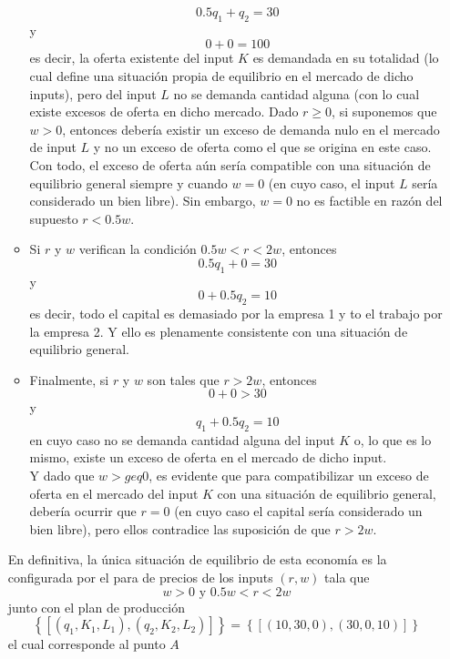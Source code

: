 \begin{enumerate}[a)]
\begin{itemize}
					$$0.5q_1 + q_2 = 30$$
			y
					$$0 + 0 = 100$$
			es decir, la oferta existente del input $K$ es demandada en su totalidad (lo cual define una situación propia de equilibrio en el mercado de dicho inputs), pero del input $L$ no se demanda cantidad alguna (con lo cual existe excesos de oferta en dicho mercado. Dado $r \geq 0$, si suponemos que $w > 0$, entonces debería existir un exceso de demanda nulo en el mercado de input $L$ y no un exceso de oferta como el que se origina en este caso. Con todo, el exceso de oferta aún sería compatible con una situación de equilibrio general siempre y cuando $w =0$ (en cuyo caso, el input $L$ sería considerado un bien libre). Sin embargo, $w = 0$ no es factible en razón del supuesto $r < 0.5w$.
			
			\item Si $r$ y $w$ verifican la condición $0.5w < r < 2w$, entonces
					$$0.5q_1 + 0 = 30$$
			y
					$$0 + 0.5q_2 = 10$$
			es decir, todo el capital es demasiado por la empresa 1 y to el trabajo por la empresa 2. Y ello es plenamente consistente con una situación de equilibrio general.
			
			\item Finalmente, si $r$ y $w$ son tales que $r > 2w$, entonces
					$$0 + 0 > 30$$
			y
					$$q_1 + 0.5q_2 = 10$$
			en cuyo caso no se demanda cantidad alguna del input $K$ o, lo que es lo mismo, existe un exceso de oferta en el mercado de dicho input.\\
			Y dado que $w >geq 0$, es evidente que para compatibilizar un exceso de oferta en el mercado del input $K$ con una situación de equilibrio general, debería ocurrir que  $r = 0$ (en cuyo caso el capital sería considerado un bien libre), pero ellos contradice las suposición de que $r > 2w$.
		\end{itemize}
   En definitiva, la única situación de equilibrio de esta economía es la configurada por el para de precios de los inputs  $(r,w)$ tala que
   		$$w > 0 \text{ y } 0.5w < r < 2w$$
   junto con el plan de producción
   		$$\left\lbrace \left[\left(q_1,K_1,L_1 \right), \left(q_2,K_2,L_2 \right) \right] \right\rbrace = \left\lbrace \left[\left(10,30,0 \right), \left(30,0,10 \right) \right] \right\rbrace$$
   	el cual corresponde al punto $A$
	   \begin{center}
\end{center}
\end{enumerate}
